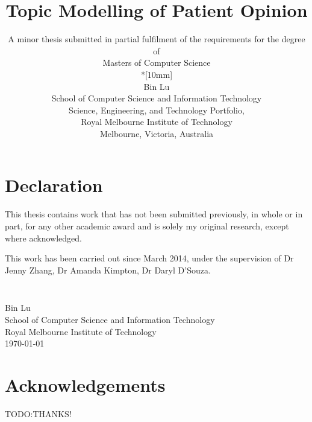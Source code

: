 \documentclass[11pt,twoside]{report}
\newcommand{\SubmissionDate}{\today}
\newcommand{\student}{Bin Lu}
\newcommand{\supervisor}{Dr Jenny Zhang, Dr Amanda Kimpton, Dr Daryl D'Souza}
\newcommand{\topic}{Topic Modelling of Patient Opinion}
\newcommand{\school}{School of Computer Science and Information Technology}
\newcommand{\program}{Masters of Computer Science}
\newcommand{\institution}{Royal Melbourne Institute of Technology}
\begin{document}
\title{{\Large\bf \topic}}
\author{
A minor thesis submitted in partial fulfilment of the requirements for the degree of
\\\program\\*[10mm]
\\\student
\\\school
\\Science, Engineering, and Technology Portfolio,
\\\institution
\\Melbourne, Victoria, Australia
}
\maketitle
\thispagestyle{empty}


\chapter*{Declaration}

This thesis contains work that has not been submitted previously, in
whole or in part, for any other academic award and is solely my
original research, except where acknowledged.

This work has been carried out since March 2014, under the
supervision of {\supervisor}.

\paragraph{}
\vspace{5cm}\noindent \\\student \\
\school\\
\institution\\
\SubmissionDate


\chapter*{Acknowledgements}

TODO:THANKS!

\tableofcontents
\listoffigures
\listoftables

\end{document}
